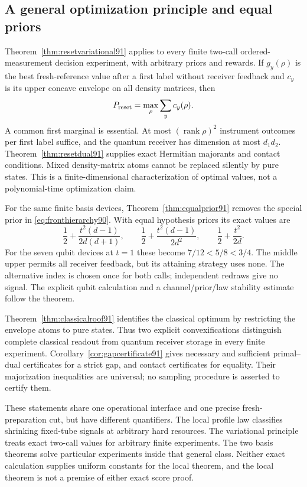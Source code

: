 \subsection{A general optimization principle and equal priors}
Theorem~\ref{thm:resetvariational91} applies to every finite two-call
ordered-measurement decision experiment, with arbitrary priors and
rewards.  If $g_y(\rho)$ is the best fresh-reference value after a first
label without receiver feedback and $c_y$ is its upper concave envelope
on all density matrices, then
\[
 P_{\rm reset}=\max_{\rho}\sum_yc_y(\rho).
\]
A common first marginal is essential.  At most
$(\operatorname{rank}\rho)^2$ instrument outcomes per first label
suffice, and the quantum receiver has dimension at most $d_1d_2$.
Theorem~\ref{thm:resetdual91} supplies exact Hermitian majorants and
contact conditions.  Mixed density-matrix atoms cannot be replaced
silently by pure states.  This is a finite-dimensional characterization
of optimal values, not a polynomial-time optimization claim.

For the same finite basis devices, Theorem~\ref{thm:equalprior91}
removes the special prior in \eqref{eq:fronthierarchy90}.  With equal
hypothesis priors its exact values are
\[
 \frac12+\frac{t^2(d-1)}{2d(d+1)},\qquad
 \frac12+\frac{t^2(d-1)}{2d^2},\qquad
 \frac12+\frac{t^2}{2d}.
\]
For the seven qubit devices at $t=1$ these become
$7/12<5/8<3/4$.  The middle upper permits all receiver feedback,
but its attaining strategy uses none.  The alternative index is chosen
once for both calls; independent redraws give no signal.  The explicit
qubit calculation and a channel/prior/law stability estimate follow the
theorem.

Theorem~\ref{thm:classicalroof91} identifies the classical optimum by
restricting the envelope atoms to pure states.  Thus two explicit
convexifications distinguish complete classical readout from quantum
receiver storage in every finite experiment.
Corollary~\ref{cor:gapcertificate91} gives necessary and sufficient
primal--dual certificates for a strict gap, and contact certificates
for equality.  Their majorization inequalities are universal; no
sampling procedure is asserted to certify them.

These statements share one operational interface and one precise
fresh-preparation cut, but have different quantifiers.  The local profile
law classifies shrinking fixed-tube signals at arbitrary hard resources.
The variational principle treats exact two-call values for arbitrary
finite experiments.  The two basis theorems solve particular experiments
inside that general class.  Neither exact calculation supplies uniform
constants for the local theorem, and the local theorem is not a premise
of either exact score proof.

